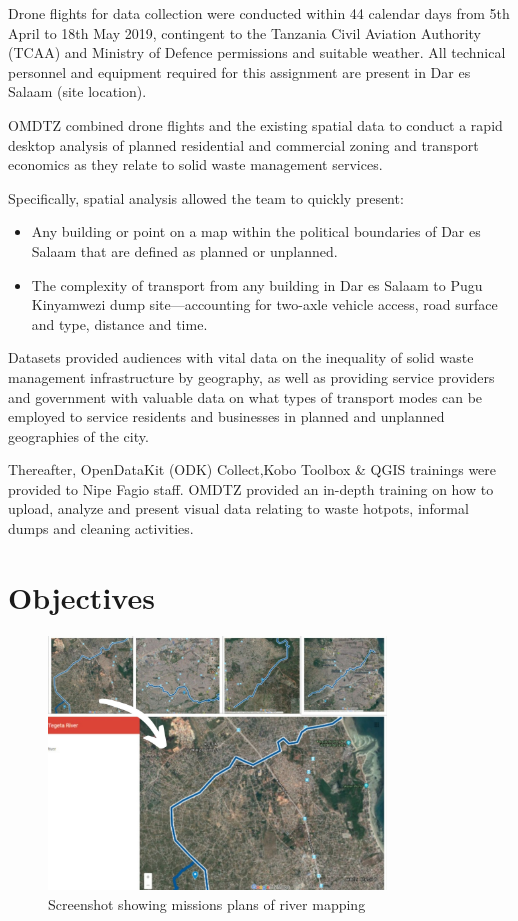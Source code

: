 \documentclass[a4paper,12pt,twoside]{article}
\begin{document}
Drone flights for data collection were conducted within 44 calendar days from 5th April to 18th May 2019, contingent  to the Tanzania Civil Aviation Authority (TCAA) and Ministry of Defence permissions and suitable weather. All technical personnel and equipment required for this assignment are present in Dar es Salaam (site location). 

OMDTZ  combined drone flights and the existing spatial data to conduct a rapid desktop analysis of planned residential and commercial zoning and transport economics as they relate to solid waste management services.

Specifically, spatial analysis allowed the team to quickly present:
\begin{itemize}
    \item Any building or point on a map within the political boundaries of Dar es Salaam that are defined as planned or unplanned.
    \item The complexity of transport from any building in Dar es Salaam to Pugu Kinyamwezi dump site---accounting for two-axle vehicle access, road surface and type, distance and time. 
\end{itemize}
    
Datasets provided audiences with vital data on the inequality of solid waste management infrastructure by geography, as well as providing service providers and government with valuable data on what types of transport modes can be employed to service residents and businesses in planned and unplanned geographies of the city.  

Thereafter, OpenDataKit (ODK) Collect,Kobo Toolbox & QGIS trainings were provided to Nipe Fagio staff. OMDTZ provided an in-depth training on how to upload, analyze and present visual data relating to waste hotpots, informal dumps and cleaning activities.


\newpage
\section{Objectives}

\lipsum[0-1]

\begin{figure}%
    \centering
    \includegraphics[width=0.8\textwidth]{images/image14.jpg}
    \caption{Screenshot showing missions plans of river mapping}
\end{figure}
\end{document}
